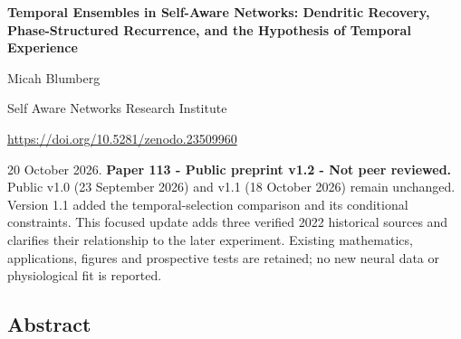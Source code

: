 \documentclass[
  american,
  11pt,
  letterpaper,
]{article}
\author{}
\date{}
\begin{document}
\begin{center}
{\LARGE\bfseries Temporal Ensembles in Self-Aware Networks: Dendritic Recovery, Phase-Structured Recurrence, and the Hypothesis of Temporal Experience\par}
\vspace{0.6em}
Micah Blumberg\par
Self Aware Networks Research Institute\par
\url{https://doi.org/10.5281/zenodo.23509960}
\end{center}

20 October 2026. \textbf{Paper 113 - Public preprint v1.2 - Not peer reviewed.} Public v1.0 (23 September 2026) and v1.1 (18 October 2026) remain unchanged. Version 1.1 added the temporal-selection comparison and its conditional constraints. This focused update adds three verified 2022 historical sources and clarifies their relationship to the later experiment. Existing mathematics, applications, figures and prospective tests are retained; no new neural data or physiological fit is reported.

\subsection{Abstract}\label{abstract}
\end{document}
